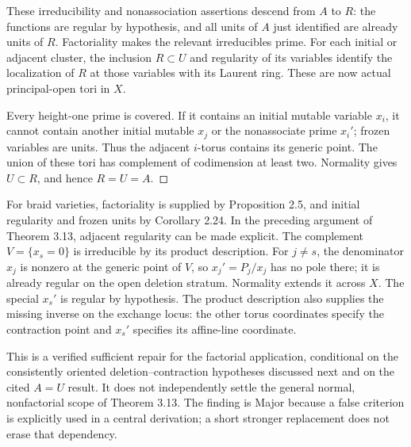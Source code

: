 \documentclass[10pt]{article}
\begin{document}
These irreducibility and nonassociation assertions descend from \(A\) to \(R\): the functions are regular by hypothesis, and all units of \(A\) just identified are already units of \(R\). Factoriality makes the relevant irreducibles prime. For each initial or adjacent cluster, the inclusion \(R\subset U\) and regularity of its variables identify the localization of \(R\) at those variables with its Laurent ring. These are now actual principal-open tori in \(X\).\par
Every height-one prime is covered. If it contains an initial mutable variable \(x_i\), it cannot contain another initial mutable \(x_j\) or the nonassociate prime \(x_i'\); frozen variables are units. Thus the adjacent \(i\)-torus contains its generic point. The union of these tori has complement of codimension at least two. Normality gives \(U\subset R\), and hence \(R=U=A\). ◻\par
For braid varieties, factoriality is supplied by Proposition 2.5, and initial regularity and frozen units by Corollary 2.24. In the preceding argument of Theorem 3.13, adjacent regularity can be made explicit. The complement \(V=\{x_s=0\}\) is irreducible by its product description. For \(j\ne s\), the denominator \(x_j\) is nonzero at the generic point of \(V\), so \(x_j'=P_j/x_j\) has no pole there; it is already regular on the open deletion stratum. Normality extends it across \(X\). The special \(x_s'\) is regular by hypothesis. The product description also supplies the missing inverse on the exchange locus: the other torus coordinates specify the contraction point and \(x_s'\) specifies its affine-line coordinate.\par
This is a verified sufficient repair for the factorial application, conditional on the consistently oriented deletion–contraction hypotheses discussed next and on the cited \(A=U\) result. It does not independently settle the general normal, nonfactorial scope of Theorem 3.13. The finding is Major because a false criterion is explicitly used in a central derivation; a short stronger replacement does not erase that dependency.\par
\end{document}
